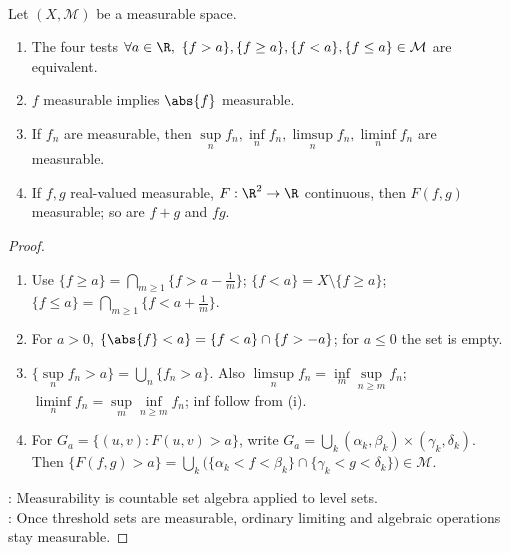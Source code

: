\begin{theorem} \label{thm:measurable-function-closure} \\
Let $(X,\mathcal{M})$ be a measurable space.
\begin{enumerate}[label=(\roman*)]
\setlength{\itemsep}{0pt}
\item The four tests $\forall a\in\R,\ \{f>a\},\{f\geq a\},\{f<a\},\{f\leq a\}\in\mathcal{M}$ are equivalent.
\item $f$ measurable implies $\abs{f}$ measurable.
\item If $f_n$ are measurable, then $\sup\limits_nf_n,\inf\limits_nf_n,\limsup\limits_nf_n,\liminf\limits_nf_n$ are measurable.
\item If $f,g$ real-valued measurable, $F:\R^2\to\R$ continuous, then $F(f,g)$ measurable; so are $f+g$ and $fg$.
\end{enumerate}
\begin{proof}
\begin{enumerate}[label=(\roman*)]
\setlength{\itemsep}{0pt}
\item Use $\{f\geq a\}=\bigcap\limits_{m\geq1}\{f>a-\frac{1}{m}\}$; $\{f<a\}=X\setminus\{f\geq a\}$; $\{f\leq a\}=\bigcap\limits_{m\geq1}\{f<a+\frac{1}{m}\}$.
\item For $a>0$, $\{\abs{f}<a\}=\{f<a\}\cap\{f>-a\}$; for $a\leq0$ the set is empty.
\item $\{\sup\limits_nf_n>a\}=\bigcup\limits_n\{f_n>a\}$. Also $\limsup\limits_nf_n=\inf\limits_m\sup\limits_{n\geq m}f_n$; $\liminf\limits_nf_n=\sup\limits_m\inf\limits_{n\geq m}f_n$; inf follow from (i).
\item For $G_a=\{(u,v):F(u,v)>a\}$, write $G_a=\bigcup\limits_k(\alpha_k,\beta_k)\times(\gamma_k,\delta_k)$.\\
Then $\{F(f,g)>a\}=\bigcup\limits_k\bigl(\{\alpha_k<f<\beta_k\}\cap\{\gamma_k<g<\delta_k\}\bigr)\in\mathcal{M}$.
\end{enumerate}
: Measurability is countable set algebra applied to level sets.\\
: Once threshold sets are measurable, ordinary limiting and algebraic operations stay measurable.
\end{proof}
\end{theorem}

